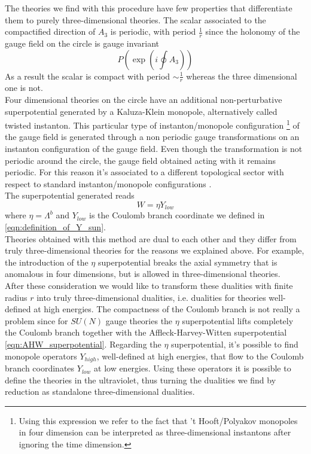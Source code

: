 The theories we find with this procedure have few properties that differentiate them to purely three-dimensional theories.
The scalar associated to the compactified direction of $A_3$ is periodic, with period $\frac{1}{r}$ since the holonomy of the gauge field on the circle is gauge invariant
\begin{equation}
 P\left( \exp{ \left( i \oint A_3 \right)}  \right) 
\end{equation}
As a result the scalar is compact with period $\sim \frac{1}{r}$ whereas the three dimensional one is not.\\
Four dimensional theories on the circle have an additional non-perturbative superpotential generated by a Kaluza-Klein monopole, alternatively called twisted instanton. 
This particular type of instanton/monopole configuration
\footnote{Using this expression we refer to the fact that 't Hooft/Polyakov monopoles in four dimension can be interpreted as three-dimensional instantons after ignoring the time dimension.}
of the gauge field is generated through a non periodic gauge transformations on an instanton configuration of the gauge field.
Even though the transformation is not periodic around the circle, the gauge field obtained acting with it remains periodic. 
For this reason it's associated to a different topological sector with respect to standard instanton/monopole configurations \cite{Davies:1999uw}. \\
The superpotential generated reads
\begin{equation}
W = \eta Y_{low}
\label{eqn:W_eta_superpotential_first}
\end{equation}
where $\eta = \Lambda^b$ and $Y_{low}$ is the Coulomb branch coordinate we defined in \eqref{eqn:definition_of_Y_sun}.\\
Theories obtained with this method are dual to each other and they differ from truly three-dimensional theories for the reasons we explained above.
For example, the introduction of the $\eta$ superpotential breaks the axial symmetry that is anomalous in four dimensions, but is allowed in three-dimensional theories.\\
After these consideration we would like to transform these dualities with finite radius $r$ into truly three-dimensional dualities, i.e. dualities for theories well-defined at high energies.
The compactness of the Coulomb branch is not really a problem since for $SU(N)$ gauge theories the $\eta$ superpotential lifts completely the Coulomb branch together with the Affleck-Harvey-Witten superpotential \eqref{eqn:AHW_superpotential}.
Regarding the $\eta$ superpotential, it's possible to find monopole operators $Y_{high}$, well-defined at high energies, that flow to the Coulomb branch coordinates $Y_{low}$ at low energies. 
Using these operators it is possible to define the theories in the ultraviolet, thus turning the dualities we find by reduction as standalone three-dimensional dualities.


